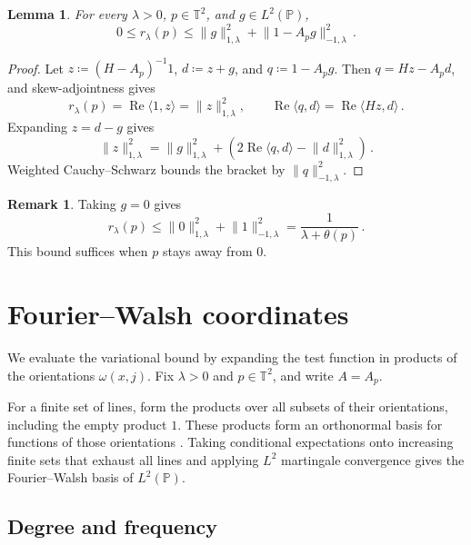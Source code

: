 \documentclass[11pt]{amsart}
\theoremstyle{plain}
\newtheorem{lemma}[theorem]{Lemma}
\theoremstyle{definition}
\newtheorem{remark}[theorem]{Remark}
\newcommand{\T}{\mathbb T}
\renewcommand{\P}{\mathbb P}
\newcommand{\1}{\mathbf 1}
\newcommand{\ip}[2]{\langle #1,#2\rangle}
\newcommand{\norm}[1]{\lVert #1\rVert}
\newcommand{\Hminus}[1]{\norm{#1}_{-1,\lambda}}
\newcommand{\Hplus}[1]{\norm{#1}_{1,\lambda}}
\begin{document}
	\begin{lemma}\label{lem:variational-bound}
		For every $\lambda>0$, $p\in\T^2$, and $g\in L^2(\P)$,
		\begin{equation}\label{eq:var}
			0\leq r_\lambda(p)\leq\Hplus g^2+\Hminus{1-A_pg}^2\, .
		\end{equation}
	\end{lemma}
	
	\begin{proof}
		Let $z\coloneqq(H-A_p)^{-1}1$, $d\coloneqq z+g$, and $q\coloneqq1-A_pg$.  Then
		$q=Hz-A_pd$, and skew-adjointness gives
		\[
		r_\lambda(p)=\operatorname{Re}\ip1z=\Hplus z^2,
		\qquad
		\operatorname{Re}\ip qd=\operatorname{Re}\ip{Hz}d\, .
		\]
		Expanding $z=d-g$ gives
		\[
		\Hplus z^2=\Hplus g^2
		+\left(2\operatorname{Re}\ip qd-\Hplus d^2\right)\, .
		\]
		Weighted Cauchy--Schwarz bounds the bracket by $\Hminus q^2$.
	\end{proof}
	
	\begin{remark}
		Taking $g=0$ gives
		\begin{equation}\label{eq:zero-function}
			r_\lambda(p)\leq\Hplus0^2+\Hminus1^2
			=\frac1{\lambda+\theta(p)}\, .
		\end{equation}
		This bound suffices when $p$ stays away from $0$.
	\end{remark}
	
	\section{Fourier--Walsh coordinates}\label{sec:coins}
	
	We evaluate the variational bound by expanding the test function in
	products of the orientations $\omega(x,j)$.  Fix $\lambda>0$ and $p\in\T^2$, and write
	$A=A_p$.
	
	For a finite set of lines, form the products over all subsets of their
	orientations, including the empty product $1$.  These products form an
	orthonormal basis for functions of those orientations
	\citep*[Theorem~1.5]{ODo14}.  Taking conditional expectations onto
	increasing finite sets that exhaust all lines and applying $L^2$
	martingale convergence gives the Fourier--Walsh basis of $L^2(\P)$.
	
	\subsection{Degree and frequency}\label{ssec:degree}
	
\end{document}
